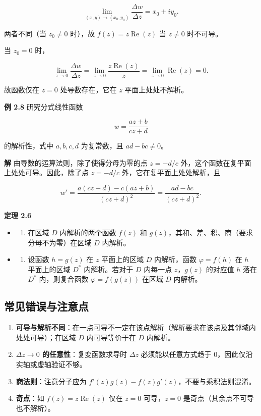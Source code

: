 \[
\lim_{(x,y)\to(x_0,y_0)}\frac{\Delta w}{\Delta z}=x_0+iy_0 .
\]

两者不同（当 \(z_0\neq0\) 时），故 \(f(z)=z\operatorname{Re}(z)\) 当
\(z\neq0\) 时不可导。

当 \(z_0=0\) 时，

\[
\lim_{z\to0}\frac{\Delta w}{\Delta z}
=\lim_{z\to0}\frac{z\operatorname{Re}(z)}{z}
=\lim_{z\to0}\operatorname{Re}(z)=0 .
\]

故函数仅在 \(z=0\) 处导数存在，它在 \(z\) 平面上处处不解析。

\textbf{例 2.8} 研究分式线性函数

\[
w=\frac{az+b}{cz+d}
\]

的解析性，式中 \(a,b,c,d\) 为复常数，且 \(ad-bc\neq 0\)。

\textbf{解} 由导数的运算法则，除了使得分母为零的点 \(z=-d/c\)
外，这个函数在复平面上处处可导。因此，除了点 \(z=-d/c\)
外，它在复平面上处处解析，且

\[
w'=\frac{a(cz+d)-c(az+b)}{(cz+d)^2}=\frac{ad-bc}{(cz+d)^2}.
\]

\textbf{定理 2.6}

\begin{itemize}
\tightlist
\item
  \begin{enumerate}
  \def\labelenumi{(\arabic{enumi})}
  \tightlist
  \item
    在区域 \(D\) 内解析的两个函数 \(f(z)\) 和
    \(g(z)\)，其和、差、积、商（要求分母不为零）在区域 \(D\) 内解析。
  \end{enumerate}
\item
  \begin{enumerate}
  \def\labelenumi{(\arabic{enumi})}
  \setcounter{enumi}{1}
  \tightlist
  \item
    设函数 \(h=g(z)\) 在 \(z\) 平面上的区域 \(D\) 内解析，函数
    \(\varphi=f(h)\) 在 \(h\) 平面上的区域 \(D^*\) 内解析。若对于 \(D\)
    内每一点 \(z\)，\(g(z)\) 的对应值 \(h\) 落在 \(D^*\) 内，则复合函数
    \(\varphi=f(g(z))\) 在区域 \(D\) 内解析。
  \end{enumerate}
\end{itemize}

\subsection{常见错误与注意点}\label{ux5e38ux89c1ux9519ux8befux4e0eux6ce8ux610fux70b9-4}

\begin{enumerate}
\def\labelenumi{\arabic{enumi}.}
\tightlist
\item
  \textbf{可导与解析不同}：在一点可导不一定在该点解析（解析要求在该点及其邻域内处处可导）；在区域
  \(D\) 内可导等价于在 \(D\) 内解析。
\item
  \textbf{\(\Delta z\to0\) 的任意性}：复变函数求导时 \(\Delta z\)
  必须能以任意方式趋于 \(0\)，因此仅沿实轴或虚轴验证不够。
\item
  \textbf{商法则}：注意分子应为
  \(f'(z)g(z)-f(z)g'(z)\)，不要与乘积法则混淆。
\item
  \textbf{奇点}：如 \(f(z)=z\operatorname{Re}(z)\) 仅在 \(z=0\)
  可导，\(z=0\) 是奇点（其余点不可导也不解析）。
\end{enumerate}

